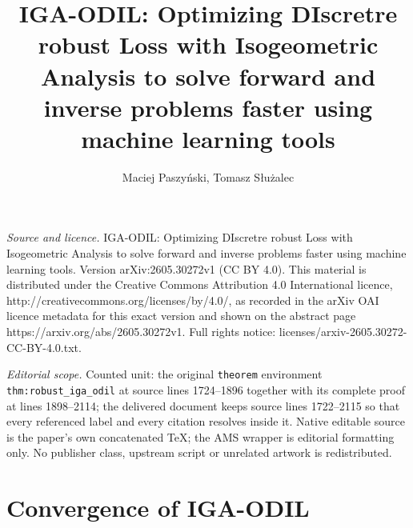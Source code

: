 \documentclass[10pt,a4paper]{amsart}
\begin{document}
\title[IGA-ODIL: Optimizing DIscretre robust Loss with Isogeometric]{IGA-ODIL: Optimizing DIscretre robust Loss with Isogeometric Analysis to solve forward and inverse problems faster using machine learning tools}
\author{Maciej Paszyński, Tomasz S{ł}użalec}
\date{}
\maketitle
\noindent\emph{Source and licence.} IGA-ODIL: Optimizing DIscretre robust Loss with Isogeometric Analysis to solve forward and inverse problems faster using machine learning tools. Version arXiv:2605.30272v1 (CC BY 4.0). This material is distributed under the Creative Commons Attribution 4.0 International licence, http://creativecommons.org/licenses/by/4.0/, as recorded in the arXiv OAI licence metadata for this exact version and shown on the abstract page https://arxiv.org/abs/2605.30272v1. Full rights notice: licenses/arxiv-2605.30272-CC-BY-4.0.txt.\par\smallskip
\noindent\textit{Editorial scope.} Counted unit: the original \texttt{theorem} environment \texttt{thm:robust\_iga\_odil} at source lines 1724--1896 together with its complete proof at lines 1898--2114; the delivered document keeps source lines 1722--2115 so that every referenced label and every citation resolves inside it. Native editable source is the paper's own concatenated TeX; the AMS wrapper is editorial formatting only. No publisher class, upstream script or unrelated artwork is redistributed.
\section{Convergence of IGA-ODIL}
\end{document}
